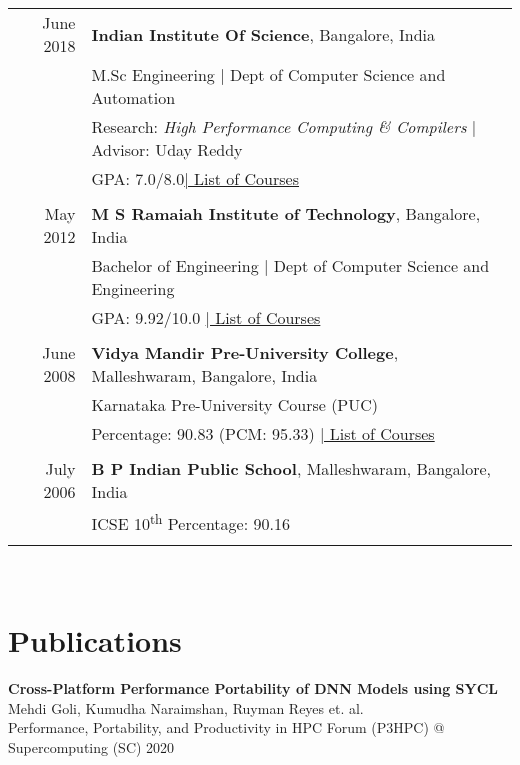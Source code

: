 \documentclass[a4paper,10pt]{article} %
\begin{document}
\begin{tabular}{rp{13cm}}
June 2018 & \textbf{Indian Institute Of Science}, Bangalore, India\\
& M.Sc Engineering | Dept of Computer Science and Automation\\
& Research: \small\emph{High Performance Computing \& Compilers} | Advisor: Uday Reddy\\
&\normalsize GPA: 7.0/8.0\hyperlink{iisc}{\hfill | \footnotesize List of Courses}\\
&\\


May 2012 & \textbf{M S Ramaiah Institute of Technology}, Bangalore, India\\
& Bachelor of Engineering | Dept of Computer Science and Engineering \\
&\normalsize GPA: 9.92/10.0 \hyperlink{msrit}{\hfill| \footnotesize List of Courses}\\
&\\


June 2008 & \textbf{Vidya Mandir Pre-University College}, Malleshwaram, Bangalore, India\\
& Karnataka Pre-University Course (PUC) \\
&\normalsize Percentage: 90.83 (PCM: 95.33) \hyperlink{hs}{\hfill| 
\footnotesize List of Courses}\\
&\\


July 2006 & \textbf{B P Indian Public School}, Malleshwaram, Bangalore, India\\
& ICSE 10\textsuperscript{th} \normalsize Percentage: 90.16 \\
&\\
\end{tabular}
\\
\section{Publications}
\textbf{Cross-Platform Performance Portability of DNN Models using SYCL} \\
\small{Mehdi Goli, Kumudha Naraimshan, Ruyman Reyes et. al.} \\
\small{ Performance, Portability, and Productivity in HPC Forum (P3HPC) @ Supercomputing (SC) 2020}
\end{document}
